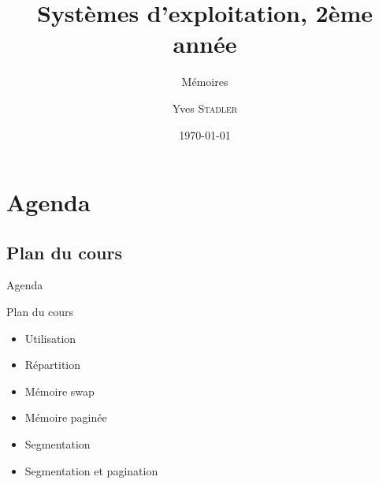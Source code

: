 
\title{Systèmes d'exploitation, 2ème année}
\subtitle{Mémoires}

\author{Yves \textsc{Stadler}}

\date{\today}




\begin{frame}
\titlepage
\end{frame}

\def\sectitle{Agenda}
\section{\sectitle}
\def\subsectitle{Plan du cours}
\subsection{\subsectitle}

\begin{frame}{\sectitle}
\begin{block}{\subsectitle}
\begin{itemize}
    \item Utilisation
    \item Répartition
    \item Mémoire swap
    \item Mémoire paginée
    \item Segmentation
    \item Segmentation et pagination
\end{itemize}
\end{block}
\end{frame}

\def\sectitle{Utilisation de la mémoire}
